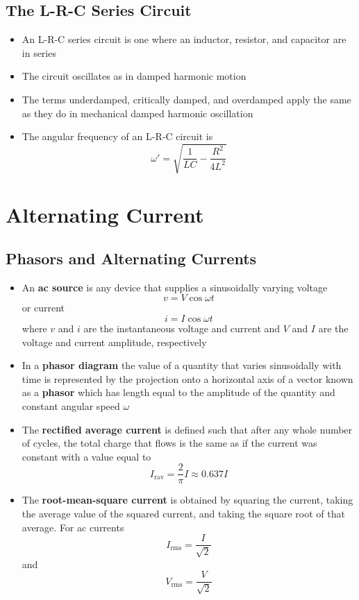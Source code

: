 \documentclass{article}
\begin{document}
\subsection{The L-R-C Series Circuit}

\begin{itemize}
  \item An L-R-C series circuit is one where an inductor, resistor, and capacitor are in series

  \item The circuit oscillates as in damped harmonic motion

  \item The terms underdamped, critically damped, and overdamped apply the same as they do in mechanical damped harmonic oscillation

\item The angular frequency of an L-R-C circuit is \[\omega' = \sqrt{\frac{1}{L C} - \frac{R^2}{4 L^2}}\]
\end{itemize}

\section{Alternating Current}

\subsection{Phasors and Alternating Currents}

\begin{itemize}
  \item An \textbf{ac source} is any device that supplies a sinusoidally varying voltage \[v = V \cos \omega t\] or current \[i = I \cos \omega t\] where $v$ and $i$ are the instantaneous voltage and current and $V$ and $I$ are the voltage and current amplitude, respectively

  \item In a \textbf{phasor diagram} the value of a quantity that varies sinusoidally with time is represented by the projection onto a horizontal axis of a vector known as a \textbf{phasor} which has length equal to the amplitude of the quantity and constant angular speed $\omega$

  \item The \textbf{rectified average current} is defined such that after any whole number of cycles, the total charge that flows is the same as if the current was constant with a value equal to \[I_\text{rav} = \frac{2}{\pi} I \approx 0.637 I\]

  \item The \textbf{root-mean-square current} is obtained by squaring the current, taking the average value of the squared current, and taking the square root of that average. For ac currents \[I_\text{rms} = \frac{I}{\sqrt{2}}\] and \[V_\text{rms} = \frac{V}{\sqrt{2}}\]
\end{itemize}
\end{document}
